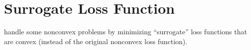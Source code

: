 \section{Surrogate Loss Function}

handle some nonconvex problems
by minimizing “surrogate” loss functions that are convex (instead of the original
nonconvex loss function).
